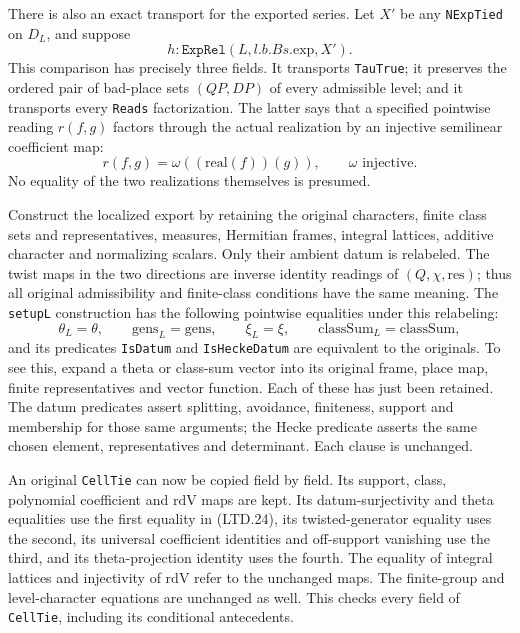 There is also an exact transport for the exported series.  Let
\(X'\) be any \texttt{NExpTied} on \(D_L\), and suppose
\[
      h:\texttt{ExpRel}(L,l.b.Bs.\mathrm{exp},X').                 \tag{LTD.22}
\]
This comparison has precisely three fields.  It transports
\texttt{TauTrue}; it preserves the ordered pair of bad-place
sets \((QP,DP)\) of every admissible level; and it transports
every \texttt{Reads} factorization.  The latter says that a
specified pointwise reading \(r(f,g)\) factors through the
actual realization by an injective semilinear coefficient map:
\[
 r(f,g)=\omega((\mathrm{real}(f))(g)),\qquad\omega\text{ injective}.
 \tag{LTD.23}
\]
No equality of the two realizations themselves is presumed.

Construct the localized export by retaining the original
characters, finite class sets and representatives, measures,
Hermitian frames, integral lattices, additive character and
normalizing scalars.  Only their ambient datum is relabeled.
The twist maps in the two directions are inverse identity
readings of \((Q,\chi,\mathrm{res})\); thus all original
admissibility and finite-class conditions have the same
meaning.  The \texttt{setupL} construction has the following
pointwise equalities under this relabeling:
\[
 \theta_L=\theta,\qquad \mathrm{gens}_L=\mathrm{gens},\qquad
 \xi_L=\xi,\qquad \mathrm{classSum}_L=\mathrm{classSum},
 \tag{LTD.24}
\]
and its predicates \texttt{IsDatum} and \texttt{IsHeckeDatum}
are equivalent to the originals.  To see this, expand a theta
or class-sum vector into its original frame, place map, finite
representatives and vector function.  Each of these has just
been retained.  The datum predicates assert splitting,
avoidance, finiteness, support and membership for those same
arguments; the Hecke predicate asserts the same chosen element,
representatives and determinant.  Each clause is unchanged.

An original \texttt{CellTie} can now be copied field by field.
Its support, class, polynomial coefficient and \(\mathrm{rdV}\)
maps are kept.  Its datum-surjectivity and theta equalities use
the first equality in (LTD.24), its twisted-generator equality
uses the second, its universal coefficient identities and
off-support vanishing use the third, and its theta-projection
identity uses the fourth.  The equality of integral lattices
and injectivity of \(\mathrm{rdV}\) refer to the unchanged maps.
The finite-group and level-character equations are unchanged
as well.  This checks every field of \texttt{CellTie},
including its conditional antecedents.

